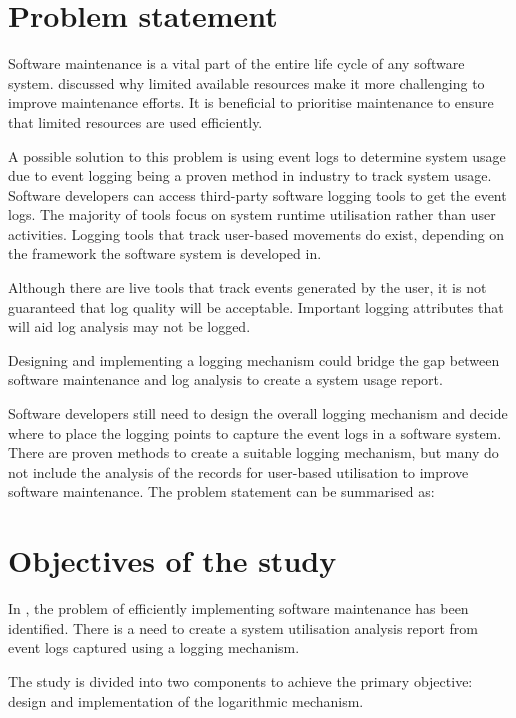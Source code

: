 \section{Problem statement}\label{sec:ch1_problemStatement}
Software maintenance is a vital part of the entire life cycle of any software system. discussed why limited available resources make it more challenging to improve maintenance efforts. It is beneficial to prioritise maintenance to ensure that limited resources are used efficiently. \par A possible solution to this problem is using event logs to determine system usage due to event logging being a proven method in industry to track system usage. Software developers can access third-party software logging tools to get the event logs. The majority of tools focus on system runtime utilisation rather than user activities. Logging tools that track user-based movements do exist, depending on the framework the software system is developed in. \par Although there are live tools that track events generated by the user, it is not guaranteed that log quality will be acceptable. Important logging attributes that will aid log analysis may not be logged. \par Designing and implementing a logging mechanism could bridge the gap between software maintenance and log analysis to create a system usage report. \par Software developers still need to design the overall logging mechanism and decide where to place the logging points to capture the event logs in a software system. There are proven methods to create a suitable logging mechanism, but many do not include the analysis of the records for user-based utilisation to improve software maintenance. The problem statement can be summarised as:

\begin{center}
	\begin{tcolorbox}[colback=lightgray, colframe=black, sharp corners=all, arc=4pt]
		\begin{minipage}{\textwidth}
			\RaggedRight\textit{\problemStatement}
		\end{minipage}
	\end{tcolorbox}
\end{center}

\clearpage

\section{Objectives of the study}\label{sec:ch1_objectives}
In , the problem of efficiently implementing software maintenance has been identified. There is a need to create a system utilisation analysis report from event logs captured using a logging mechanism. \par The study is divided into two components to achieve the primary objective: design and implementation of the logarithmic mechanism. 

